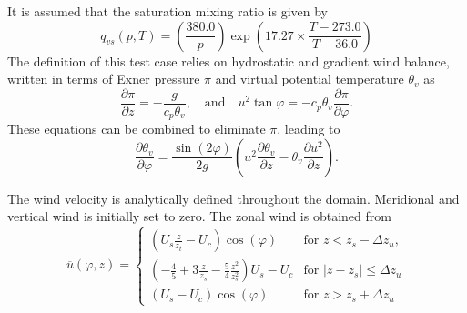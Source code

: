 \documentclass[times,doublespace]{fldauth}
\newcommand{\pdiff}[2]{\frac{\partial #1}{\partial #2}}
\begin{document}
{It is assumed that the saturation mixing ratio is given by
\begin{equation}
q_{vs}(p,T) = \left( \frac{380.0}{p} \right) \exp\left(17.27 \times \frac{T-273.0}{T-36.0}\right)
\end {equation}  The definition of this test case relies on hydrostatic and gradient wind balance, written in terms of Exner pressure $\pi$ and virtual potential temperature $\theta_v$ as
\begin{equation} \label{eq:BalanceEq}
\pdiff{\pi}{z} = - \frac{g}{c_p \theta_v}, \quad \mbox{and} \quad u^2 \tan \varphi = - c_p \theta_v \pdiff{\pi}{\varphi}.
\end{equation}  These equations can be combined to eliminate $\pi$, leading to
\begin{equation} \label{eq:CombinedBalanceEq}
\pdiff{\theta_v}{\varphi} = \frac{\sin (2 \varphi)}{2 g} \left( u^2 \pdiff{\theta_v}{z} - \theta_v \pdiff{u^2}{z} \right).
\end{equation}

The wind velocity is analytically defined throughout the domain.  Meridional and vertical wind is initially set to zero.  The zonal wind is obtained from
\begin{equation}
\overline{u}(\varphi,z) = \left\{ \begin{array}{ll}
\displaystyle \left(U_s\frac{z}{z_t}-U_c\right)\cos(\varphi) & \mbox{for $z < z_s - \Delta z_u$}, \\[2.0ex]
\displaystyle \left(-\frac{4}{5}+3\frac{z}{z_s}-\frac{5}{4}\frac{z^2}{z_s^2}\right)U_s-U_c & \mbox{for $\vert z-z_s \vert \leq \Delta z_u$} \\[2.0ex]
\displaystyle \left(U_s-U_c\right)\cos(\varphi) & \mbox{for $z > z_s + \Delta z_u$}
\end{array} \right.
\end{equation}

}
\end{document}
